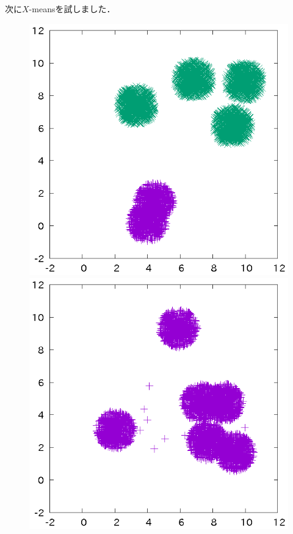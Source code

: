 ﻿\documentclass{jsarticle}
\begin{document}
次に$X$-meansを試しました．
\begin{figure}[h]
\begin{center}
 \begin{minipage}{.32\textwidth}
 \begin{center}
 \includegraphics[height=.18\textheight]{fig/xb2.eps}
 \end{center}
 \end{minipage}
 \begin{minipage}{.32\textwidth}
 \begin{center}
 \includegraphics[height=.18\textheight]{fig/xb1.eps}

\end{center}
\end{minipage}
\end{center}
\end{figure}
\end{document}
